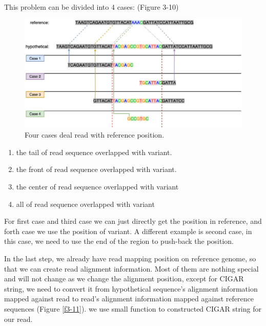 \begin{flushleft}
This problem can be divided into 4 cases: (Figure 3-10)
\end{flushleft}
\begin{figure}[H]
    \centering
    \includegraphics[width=1\columnwidth]{body/image/3-10.png}
    \captionsetup{labelfont=bf}
    \renewcommand{\baselinestretch}{1.0}
    \vspace{-1cm}
    \caption[alignment read]{Four cases deal read with reference position.}
    \label{f3-10}
\end{figure}

\begin{enumerate}
    \item the tail of read sequence overlapped with variant.
    \item the front of read sequence overlapped with variant.
    \item the center of read sequence overlapped with variant
    \item all of read sequence overlapped with variant
\end{enumerate}

For first case and third case we can just directly get the position in reference, and forth case we use the position of variant. A different example is second case, in this case, we need to use the end of the region to push-back the position.

In the last step, we already have read mapping position on reference genome, so that we can create read alignment information. Most of them are nothing special and will not change as we change the alignment position, except for CIGAR string, we need to convert it from hypothetical sequence’s alignment information mapped against read to read’s alignment information mapped against reference sequences (Figure \ref{f3-11}). we use small function to constructed CIGAR string for our read.

